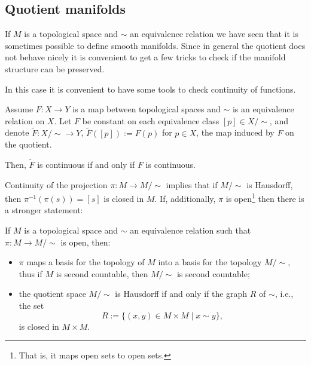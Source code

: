 \subsection{Quotient manifolds}\label{sec:quotient}

If $M$ is a topological space and $\sim$ an equivalence relation we have seen that it is sometimes possible to define smooth manifolds.
Since in general the quotient does not behave nicely it is convenient to get a few tricks to check if the manifold structure can be preserved.

In this case it is convenient to have some tools to check continuity of functions.

\begin{proposition}
	Assume $F:X\to Y$ is a map between topological spaces and $\sim$ is an equivalence relation on $X$.
	Let $F$ be constant on each equivalence class $[p]\in X/\!\sim$, and denote $\widetilde F:X/\!\sim\to Y$, $\widetilde F([p]) := F(p)$ for $p\in X$, the map induced by $F$ on the quotient.

	Then, $\widetilde F$ is continuous if and only if $F$ is continuous.
\end{proposition}

Continuity of the projection $\pi: M \to M/\!\sim$ implies that if $M/\!\sim$ is Hausdorff, then $\pi^{-1}(\pi(s)) = [s]$ is closed in $M$.
If, additionally, $\pi$ is open\footnote{That is, it maps open sets to open sets.} then there is a stronger statement:
\begin{theorem}\label{thm:openproj}
	If $M$ is a topological space and $\sim$ an equivalence relation such that $\pi:M \to M/\!\sim$ is open, then:
	\begin{itemize}
		\item $\pi$ maps a basis for the topology of $M$ into a basis for the topology $M/\!\sim$, thus if $M$ is second countable, then $M/\!\sim$ is second countable;
		\item the quotient space $M/\!\sim$ is Hausdorff if and only if the graph $R$ of $\sim$, i.e., the set
		      \begin{equation}
			      R := \{(x,y)\in M\times M \mid x\sim y\},
		      \end{equation}
		      is closed in $M\times M$.
	\end{itemize}
\end{theorem}

